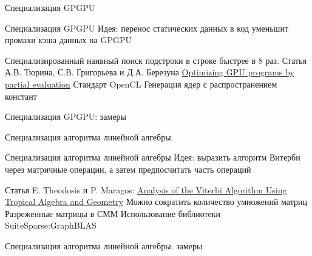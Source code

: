 \documentclass[hyperref={pdfpagelabels=false}]{beamer}
\begin{document}
\begin{frame}{Специализация GPGPU}
\begin{block}{Специализация GPGPU}
	Идея: перенос статических данных в код уменьшит промахи 
	кэша данных на GPGPU
\end{block}
\vfill
Специализированный наивный поиск подстроки в строке быстрее в 8 раз. 
Статья  А.В. Тюрина, С.В. Григорьева и Д.А. Березуна \href{https://www.researchgate.net/publication/339368918_Optimizing_GPU_programs_by_partial_evaluation}{Optimizing GPU programs by partial evaluation}
\vfill
Стандарт OpenCL
\vfill
Генерация ядер с распространением констант
\end{frame}


\begin{frame}{Специализация GPGPU: замеры}
\end{frame}


\begin{frame}{Специализация алгоритма линейной алгебры}
\begin{block}{Специализация алгоритма линейной алгебры}
	Идея: выразить алгоритм Витерби через матричные операции, 
		а затем предпосчитать часть операций
\end{block}
\vfill
	Статья E. Theodosis и P. Maragos: \href{http://cvsp.cs.ntua.gr/publications/confr/2018_TheodosisMaragos_AnalysisViterbi-TropicalAlgebraGeometry_SPAWC.pdf}
	{Analysis of the Viterbi Algorithm Using 
	Tropical Algebra and Geometry}
\vfill
	Можно сократить количество умножений матриц
\vfill
	Разреженные матрицы в СММ
\vfill
	Использование библиотеки SuiteSparse:GraphBLAS
\end{frame}


\begin{frame}{Специализация алгоритма линейной алгебры: замеры}
\end{frame}
\end{document}

